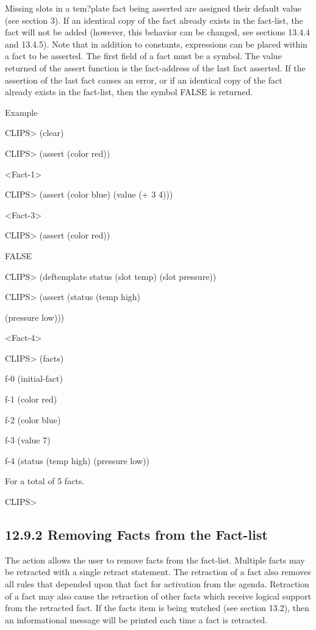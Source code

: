 \documentclass[letterpaper,10pt,english]{sphinxmanual}
\begin{document}

\begin{sphinxVerbatim}[commandchars=\\\{\}]
 
\end{sphinxVerbatim}

Missing slots in a tem?plate fact being asserted are assigned their
default value (see section 3). If an identical copy of the fact already
exists in the fact-list, the fact will not be added (however, this
behavior can be changed, see sections 13.4.4 and 13.4.5). Note that in
addition to constants, expressions can be placed within a fact to be
asserted. The first field of a fact must be a symbol. The value returned
of the assert function is the fact-address of the last fact asserted. If
the assertion of the last fact causes an error, or if an identical copy
of the fact already exists in the fact-list, then the symbol FALSE is
returned.

Example

CLIPS\textgreater{} (clear)

CLIPS\textgreater{} (assert (color red))

\textless{}Fact-1\textgreater{}

CLIPS\textgreater{} (assert (color blue) (value (+ 3 4)))

\textless{}Fact-3\textgreater{}

CLIPS\textgreater{} (assert (color red))

FALSE

CLIPS\textgreater{} (deftemplate status (slot temp) (slot pressure))

CLIPS\textgreater{} (assert (status (temp high)

(pressure low)))

\textless{}Fact-4\textgreater{}

CLIPS\textgreater{} (facts)

f-0 (initial-fact)

f-1 (color red)

f-2 (color blue)

f-3 (value 7)

f-4 (status (temp high) (pressure low))

For a total of 5 facts.

CLIPS\textgreater{}


\subsection{12.9.2 Removing Facts from the Fact-list}
\label{\detokenize{actions:removing-facts-from-the-fact-list}}
The  action allows the user to remove facts from the
fact-list. Multiple facts may be retracted with a single retract
statement. The retraction of a fact also removes all rules that depended
upon that fact for activation from the agenda. Retraction of a fact may
also cause the retraction of other facts which receive logical support
from the retracted fact. If the facts item is being watched (see section
13.2), then an informational message will be printed each time a fact is
retracted.
\end{document}
